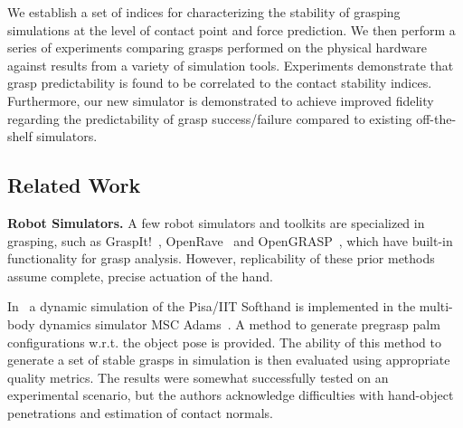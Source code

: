 We establish a set of indices for characterizing the stability of grasping simulations at the level of contact point and force prediction.  We then perform a series of experiments comparing grasps performed on the physical hardware against results from a variety of simulation tools. Experiments demonstrate that grasp predictability is found to be correlated to the contact stability indices.  Furthermore, our new simulator is demonstrated to achieve improved fidelity regarding the predictability of grasp success/failure compared to existing off-the-shelf simulators.  



\subsection{Related Work}
\label{relwork}


{\bf Robot Simulators.}
A few robot simulators and toolkits are specialized in grasping, such as GraspIt!~\cite{Miller04}, OpenRave~\cite{Diankov08OpenRAVE} and OpenGRASP~\cite{Leon10OpenGRASP}, which have built-in functionality for grasp analysis. However, replicability of these prior methods assume complete, precise actuation of the hand.

In~\cite{Bonilla14} a dynamic simulation of the Pisa/IIT Softhand is implemented in the multi-body dynamics simulator MSC Adams~\cite{MSCAdams}. A method to generate pregrasp palm configurations w.r.t. the object pose is provided. The ability of this method to generate a set of stable grasps in simulation is then evaluated using  appropriate quality metrics. The results were somewhat successfully tested on an experimental scenario, but the authors acknowledge difficulties with hand-object penetrations and estimation of contact normals.

